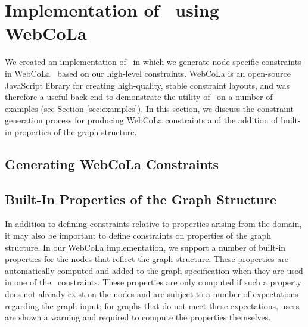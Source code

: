 \section{Implementation of \projectname~using WebCoLa}
We created an implementation of \projectname\ in which we generate node
specific constraints in WebCoLa~\cite{WebCoLa} based on our high-level
constraints. WebCoLa is an open-source JavaScript library for
creating high-quality, stable constraint layouts, and was therefore a
useful back end to demonstrate the utility of \projectname\ on a number of
examples (see Section \ref{sec:examples}). In this section, we discuss the
constraint generation process for producing WebCoLa constraints and the 
addition of built-in properties of the graph structure.

\subsection{Generating WebCoLa Constraints}


\subsection{Built-In Properties of the Graph Structure}
In addition to defining constraints relative to properties arising from
the domain, it may also be important to define constraints on properties
of the graph structure. In our WebCoLa implementation, we support a 
number of built-in properties for the nodes that reflect the graph structure.
These properties are automatically computed and added to the graph 
specification when they are used in one of the \projectname\ constraints. 
These properties are only computed if such a property does not
already exist on the nodes and are subject to a number of expectations
regarding the graph input; for graphs that do not meet these expectations,
users are shown a warning and required to compute the properties
themselves.

